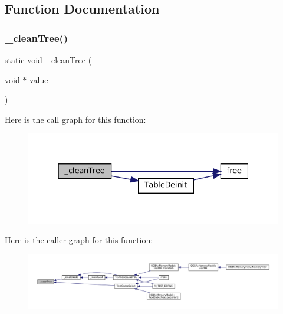 \subsection{Function Documentation}
\mbox{\label{text-codec_8c_a0ed19a171f0f782872686bc021d9f74e}} 
\subsubsection{\texorpdfstring{\+\_\+clean\+Tree()}{\_cleanTree()}}
{\footnotesize\ttfamily static void \+\_\+clean\+Tree (\begin{DoxyParamCaption}\item[{void $\ast$}]{value }\end{DoxyParamCaption})\hspace{0.3cm}{\ttfamily [static]}}

Here is the call graph for this function\+:
\nopagebreak
\begin{figure}[H]
\begin{center}
\leavevmode
\includegraphics[width=331pt]{text-codec_8c_a0ed19a171f0f782872686bc021d9f74e_cgraph}
\end{center}
\end{figure}
Here is the caller graph for this function\+:
\nopagebreak
\begin{figure}[H]
\begin{center}
\leavevmode
\includegraphics[width=350pt]{text-codec_8c_a0ed19a171f0f782872686bc021d9f74e_icgraph}
\end{center}
\end{figure}
\mbox{\label{text-codec_8c_a2a8c8d4c442ca97dc71895c2304b04ef}} 
